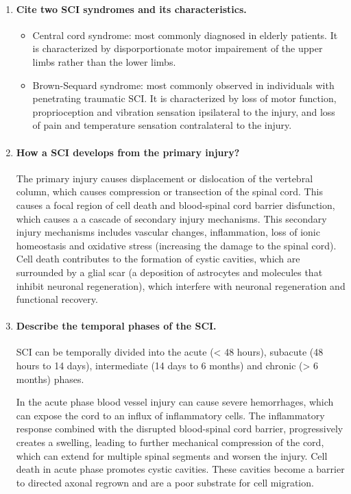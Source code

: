 \documentclass[12pt,article,oneside,a4paper]{memoir}
\begin{document}
\begin{enumerate}
\item \paragraph{Cite two SCI syndromes and its characteristics.}
\begin{itemize}
\item Central cord syndrome: most commonly diagnosed in elderly patients. It is
characterized by disporportionate motor impairement of the upper limbs rather
than the lower limbs.
\item Brown-Sequard syndrome: most commonly observed in individuals with
penetrating traumatic SCI. It is characterized by loss of motor function,
proprioception and vibration sensation ipsilateral to the injury, and loss of
pain and temperature sensation contralateral to the injury.
\end{itemize}

\item \paragraph{How a SCI develops from the primary injury?}
The primary injury causes displacement or dislocation of the vertebral column,
which causes compression or transection of the spinal cord. This causes a focal
region of cell death and blood-spinal cord barrier disfunction, which causes a 
a cascade of secondary injury mechanisms. This secondary injury mechanisms
includes vascular changes, inflammation, loss of ionic homeostasis and
oxidative stress (increasing the damage to the spinal cord). Cell death
contributes to the formation of cystic cavities, which are surrounded by a
glial scar (a deposition of astrocytes and molecules that inhibit neuronal
regeneration), which interfere with neuronal regeneration and functional
recovery.

\item \paragraph{Describe the temporal phases of the SCI.}
SCI can be temporally divided into the acute (< 48 hours), subacute (48 hours
to 14 days), intermediate (14 days to 6 months) and chronic (> 6 months) phases.

In the acute phase blood vessel injury can cause severe hemorrhages, which can
expose the cord to an influx of inflammatory cells. The inflammatory response
combined with the disrupted blood-spinal cord barrier, progressively creates a
swelling, leading to further mechanical compression of the cord, which can
extend for multiple spinal segments and worsen the injury. Cell death in acute
phase promotes cystic cavities. These cavities become a barrier to directed
axonal regrown and are a poor substrate for cell migration.


\end{enumerate}
\end{document}
